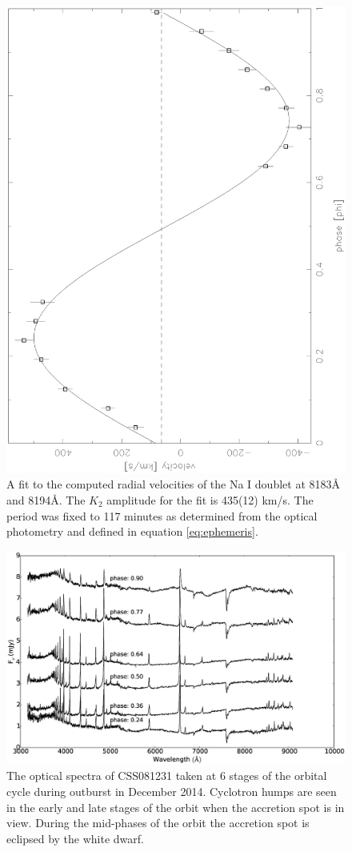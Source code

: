\documentclass[a4paper,fleqn,usenatbib]{mnras}
\begin{document}
\begin{figure}
\centering
\includegraphics[height=\columnwidth, angle=270]{images/NaIrvfit.eps}
\caption[Caption for RVs]{A fit to the computed radial velocities of the Na I doublet at 8183\AA~ and 8194\AA. The $K_2$ amplitude for the fit is 435(12) km/s.  The period was fixed to 117 minutes as determined from the optical photometry and defined in equation \ref{eq:ephemeris}. }
\label{fig:rv-fit}
\end{figure}

\begin{figure}
\centering
\includegraphics[width=\textwidth]{images/CSS081231_spectra.eps}
\caption[Caption for spectra]{The optical spectra of CSS081231 taken at 6 stages of the orbital cycle during outburst in December 2014. Cyclotron humps are seen in the early and late stages of the orbit when the accretion spot is in view. During the mid-phases of the orbit the accretion spot is eclipsed by the white dwarf. }
\label{fig:spectra-outburst}
\end{figure}
\end{document}
